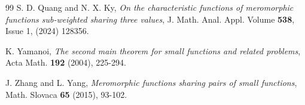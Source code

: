 \documentclass[12pt,leqno]{amsart}
\numberwithin{equation}{section}
\begin{document}
\begin{thebibliography}{99}
 S. D. Quang and N. X. Ky, \textit{On the characteristic functions of meromorphic functions sub-weighted sharing three values}, J. Math. Anal. Appl. Volume \textbf{538}, Issue 1, (2024) 128356.


 K. Yamanoi, \textit{The second main theorem for small functions and related problems}, Acta Math. \textbf{192} (2004), 225-294.

 J. Zhang and L. Yang, \textit{Meromorphic functions sharing pairs of small functions}, Math. Slovaca \textbf{65} (2015), 93-102.
\end{thebibliography}
\end{document}
